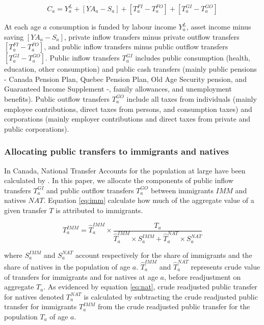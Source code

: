 \begin{equation}\label{eq:1}
  C_a = Y^L_a+[YA_a-S_a]+[T^{FI}_a-T^{FO}_a]+[T^{GI}_a-T^{GO}_a]
\end{equation}

At each age \(a\) consumption is funded by labour income \(Y^L_a\), asset income minus saving \([YA_a-S_a]\), private inflow transfers minus private outflow transfers \([T^{FI}_a-T^{FO}_a]\), and public inflow transfers minus public outflow transfers \([T^{GI}_a-T^{GO}_a]\).
Public inflow transfers \(T^{GI}_a\) includes public consumption (health, education, other consumption) and public cash transfers (mainly public pensions - Canada Pension Plan, Quebec Pension Plan, Old Age Security pension, and Guaranteed Income Supplement -, family allowances, and unemployment benefits).
Public outflow transfers  \(T^{GO}_a\) include all taxes from individuals (mainly employee contributions, direct taxes from persons, and consumption taxes) and corporations (mainly employer contributions and direct taxes from private and public corporations).

\subsubsection*{Allocating public transfers to immigrants and natives}

In Canada, National Transfer Accounts for the population at large have been calculated by \citet{Merette:2019kz}.
In this paper, we allocate the components of public inflow transfers \(T^{GI}_a\) and public outflow transfers \(T^{GO}_a\) between immigrants \(IMM\) and natives \(NAT\).
Equation \eqref{eq:imm} calculate how much of the aggregate value of a given transfer \(T\) is attributed to immigrants.

\begin{equation}\label{eq:imm}
 {T}^{IMM}_a = \hat{T}^{IMM}_a \times \frac{{T}_a}{\hat{T}^{IMM}_a \times S^{IMM}_a + \hat{T}^{NAT}_a \times S^{NAT}_a}
\end{equation}

where \( S^{IMM}_a \) and \( S^{NAT}_a \) account respectively for the share of immigrants and the share of natives in the population of age \(a\). \(\hat{T}^{IMM}_a \) and \( \hat{T}^{NAT}_a\) represents crude value of transfers for immigrants and for natives at age \(a\), before readjustment on aggregate \({T}_a \).
As evidenced by equation \eqref{eq:nat}, crude readjusted public transfer for natives denoted \({T}^{NAT}_a \)  is calculated by subtracting the crude readjusted public transfer for immigrants \({T}^{IMM}_a \) from the crude readjusted public transfer for the population \({T}_a \) of age \(a\).

